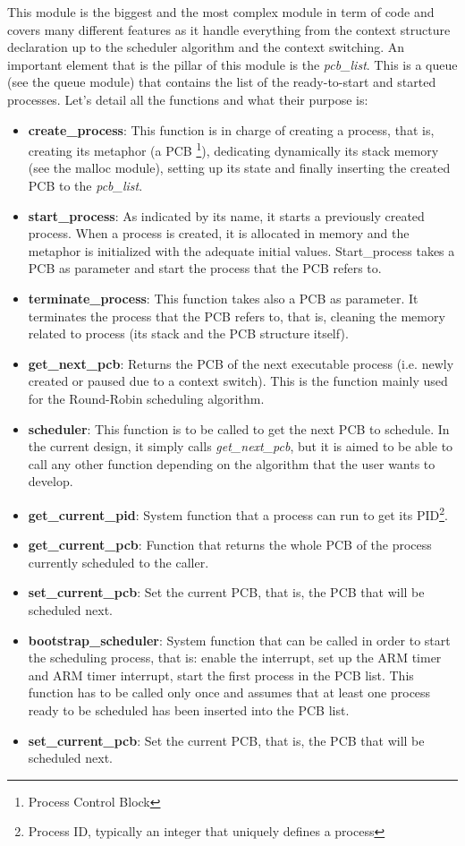 This module is the biggest and the most complex module in term of code and covers many different features as it handle everything from the context structure declaration up to the scheduler algorithm and the context switching. An important element that is the pillar of this module is the \textit{pcb\_list}. This is a queue (see the queue module) that contains the list of the ready-to-start and started processes. Let's detail all the functions and what their purpose is:
\begin{itemize}
	\item \textbf{create\_process}: This function is in charge of creating a process, that is, creating its metaphor (a PCB \footnote{Process Control Block}), dedicating dynamically its stack memory (see the malloc module), setting up its state and finally inserting the created PCB to the \textit{pcb\_list}.
	\item \textbf{start\_process}: As indicated by its name, it starts a previously created process. When a process is created, it is allocated in memory and the metaphor is initialized with the adequate initial values. Start\_process takes a PCB as parameter and start the process that the PCB refers to.
	\item \textbf{terminate\_process}: This function takes also a PCB as parameter. It terminates the process that the PCB refers to, that is, cleaning the memory related to process (its stack and the PCB structure itself).
	\item \textbf{get\_next\_pcb}: Returns the PCB of the next executable process (i.e. newly created or paused due to a context switch). This is the function mainly used for the Round-Robin scheduling algorithm.
	\item \textbf{scheduler}: This function is to be called to get the next PCB to schedule. In the current design, it simply calls \textit{get\_next\_pcb}, but it is aimed to be able to call any other function depending on the algorithm that the user wants to develop.
	\item \textbf{get\_current\_pid}: System function that a process can run to get its PID\footnote{Process ID, typically an integer that uniquely defines a process}.
	\item \textbf{get\_current\_pcb}: Function that returns the whole PCB of the process currently scheduled to the caller.
	\item \textbf{set\_current\_pcb}: Set the current PCB, that is, the PCB that will be scheduled next.
	\item \textbf{bootstrap\_scheduler}: System function that can be called in order to start the scheduling process, that is: enable the interrupt, set up the ARM timer and ARM timer interrupt, start the first process in the PCB list. This function has to be called only once and assumes that at least one process ready to be scheduled has been inserted into the PCB list.
	\item \textbf{set\_current\_pcb}: Set the current PCB, that is, the PCB that will be scheduled next.
\end{itemize}



